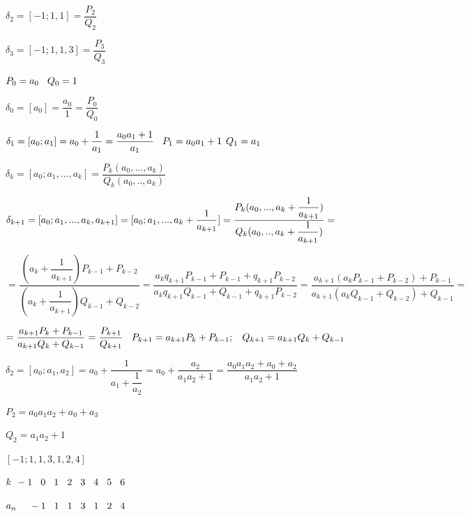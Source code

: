 \documentclass[12pt]{article}
\begin{document}
$\delta_2 = [-1;1,1] = \dfrac{P_2}{Q_2}$

$\delta_3 = [-1;1,1,3] = \dfrac{P_3}{Q_3}$

$P_0 = a_0 \hspace{2 ex} Q_0 = 1$

$\delta_0 = [a_0] = \dfrac{a_0}{1} = \dfrac{P_0}{Q_0}$

$\delta_1 = [a_0; a_1] = a_0 + \dfrac{1}{a_1} = \dfrac{a_0 a_1 +1}{a_1} \hspace{2 ex} P_1 = a_0 a_1 +1 \hspace{1 ex} Q_1 = a_1$

$\delta_k = [a_0;a_1,...,a_k] = \dfrac{P_k(a_0,...,a_k)}{Q_k(a_0,..,a_k)}$

$\delta_{k+1} = [a_0;a_1,...,a_k,a_{k+1}] =[a_0;a_1,...,a_k+\dfrac{1}{ a_{k+1}}] =  \dfrac{P_k(a_0,...,a_k+\dfrac{1}{ a_{k+1}} )}{Q_k(a_0,..,a_k+\dfrac{1}{ a_{k+1}})} = \vspace{2 ex}$

$= \dfrac{(a_k + \dfrac{1}{a_{k+1}}) P_{k-1} + P_{k-2}}{(a_k + \dfrac{1}{a_{k+1}}) Q_{k-1} + Q_{k-2}} = \dfrac{a_k q_{k+1} P_{k-1} + P_{k-1} + q_{k+1} P_{k-2}}{a_k q_{k+1} Q_{k-1} + Q_{k-1} + q_{k+1} P_{k-2}} = \dfrac{a_{k+1} (a_k P_{k-1} + P_{k-2}) + P_{k-1}}{a_{k+1} (a_k Q_{k-1} + Q_{k-2}) + Q_{k-1}} = $

$= \dfrac{a_{k+1} P_k + P_{k-1}}{a_{k+1} Q_k + Q_{k-1}} = \dfrac{P_{k+1}}{Q_{k+1}} \hspace{2 ex} P_{k+1} = a_{k+1} P_k + P_{k-1} ; \hspace{2 ex} Q_{k+1} = a_{k+1} Q_k + Q_{k-1} \vspace{2 ex}$


$\delta_2 = [a_0;a_1,a_2] = a_0 + \dfrac{1}{a_1 + \dfrac{1}{a_2}} = a_0 + \dfrac{a_2}{a_1 a_2 + 1} = \dfrac{a_0 a_1 a_2 + a_0 + a_2}{a_1 a_2 + 1}$

$P_2 = a_0 a_1 a_2 + a_0 + a_3$

$Q_2 = a_1 a_2 +1$

$[-1;1,1,3,1,2,4]$

$k \hspace{1 ex} -1\hspace{2 ex}0\hspace{2 ex}1\hspace{2 ex}2\hspace{2 ex}3\hspace{2 ex}4\hspace{2 ex}5\hspace{2 ex}6$

$a_n  \hspace{1 ex}\hspace{2 ex}-1\hspace{2 ex}1\hspace{2 ex}1\hspace{2 ex}3\hspace{2 ex}1\hspace{2 ex}2\hspace{2 ex}4$
\end{document}
